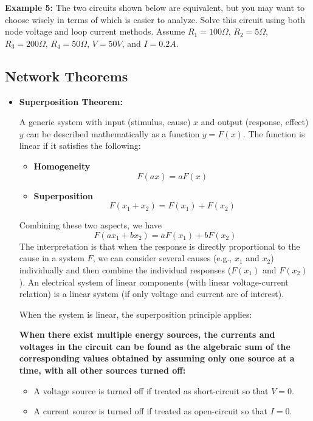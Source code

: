 {\bf Example 5:} The two circuits shown below are equivalent, but you may want to
choose wisely in terms of which is easier to analyze. Solve this circuit using
both node voltage and loop current methods. Assume $R_1=100\Omega$, $R_2=5\Omega$, 
$R_3=200\Omega$, $R_4=50\Omega$, $V=50V$, and $I=0.2A$.

  


\subsection*{Network Theorems}

\begin{itemize}
\item {\bf Superposition Theorem:}

A generic system with input (stimulus, cause) $x$ and output (response,
effect) $y$ can be described mathematically as a function $y=F(x)$. 
The function is linear if it satisfies the following:
\begin{itemize}
\item {\bf Homogeneity}
  \[	F(ax)=aF(x) \]
\item {\bf Superposition}
  \[ F(x_1+x_2)=F(x_1)+F(x_2)	\]
\end{itemize}
Combining these two aspects, we have
\[	F(ax_1+bx_2)=aF(x_1)+bF(x_2)	\]
The interpretation is that when the response is directly proportional to 
the cause in a system $F$, we can consider several causes (e.g., $x_1$ 
and $x_2$) individually and then combine the individual responses ($F(x_1)$ 
and $F(x_2)$). An electrical system of linear components (with linear 
voltage-current relation) is a linear system (if only voltage and current 
are of interest).

When the system is linear, the superposition principle applies:

{\bf When there exist multiple energy sources, the currents and voltages in 
the circuit can be found as the algebraic sum of the corresponding values 
obtained by assuming only one source at a time, with all other sources turned 
off:
\begin{itemize}
\item A voltage source is turned off if treated as short-circuit so that $V=0$.
\item A current source is turned off if treated as open-circuit so that $I=0$.
\end{itemize}}


\end{itemize}
